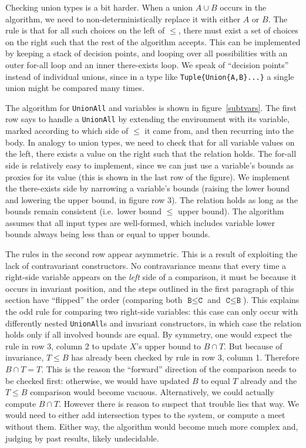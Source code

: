Checking union types is a bit harder. When a union $A\cup B$ occurs in the
algorithm, we need to non-deterministically replace it with either $A$ or
$B$. The rule is that for all such choices on the left of $\leq$, there
must exist a set of choices on the right such that the rest of the
algorithm accepts. This can be implemented by keeping a stack of
decision points, and looping over all possibilities with an outer
for-all loop and an inner there-exists loop. We speak of ``decision points''
instead of individual unions, since in a type like \texttt{Tuple\{Union\{A,B\}...\}}
a single union might be compared many times.

The algorithm for \texttt{UnionAll} and variables is shown in figure~\ref{subtvars}.
The first row says to handle a \texttt{UnionAll} by extending the environment
with its variable, marked according to which side of $\leq$ it came from,
and then recurring into the body.
In analogy to union types, we need to check that for all variable values on
the left, there exists a value on the right such that the relation holds.
The for-all side is relatively easy to implement, since we can just use
a variable's bounds as proxies for its value (this is shown in
the last row of the figure).
We implement the there-exists side by narrowing a variable's bounds
(raising the lower bound and lowering the upper bound, in figure row 3).
The relation holds
as long as the bounds remain consistent (i.e.\ lower bound $\leq$
upper bound).
The algorithm assumes that all input types are well-formed,
which includes variable lower bounds always being less than or equal to
upper bounds.

The rules in the second row appear asymmetric.
This is a result of exploiting the lack of contravariant constructors.
No contravariance means that every time a
right-side variable appears on the \emph{left} side of a comparison,
it must be because it occurs in invariant position, and the steps outlined
in the first paragraph of this section have ``flipped'' the order
(comparing both $\texttt{B}\leq\texttt{C}$ and $\texttt{C}\leq\texttt{B}$).
This explains the odd rule for comparing two right-side variables:
this case can only occur with differently nested \texttt{UnionAll}s and
invariant constructors, in which case the relation holds only if
all involved bounds are equal.
By symmetry, one would expect the rule in row 3, column 2 to
update $X$'s upper bound to $B\cap T$. But because of invariance,
$T\leq B$ has already been checked by rule in row 3, column 1.
Therefore $B\cap T = T$. This is the reason the ``forward''
direction of the comparison needs to be checked first: otherwise,
we would have updated $B$ to equal $T$ already and the $T\leq B$
comparison would become vacuous. Alternatively, we could actually
compute $B\cap T$. However there is reason to suspect that
trouble lies that way. We would need to either add intersection types
to the system, or compute a meet without them. Either way, the
algorithm would become much more complex and, judging by past
results, likely undecidable.

